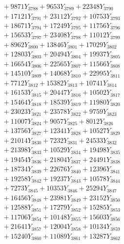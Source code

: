 \documentclass[a4paper,10pt]{article}
\begin{document}
{\begin{align}
&\;  + 9871 Y_{3788} + 9653 Y_{3789} + 22348 Y_{3790} \\[0.3ex]
&\;  + 17121 Y_{3791} + 23112 Y_{3792} + 10753 Y_{3793} \\[0.3ex]
&\;  + 18671 Y_{3794} + 17249 Y_{3795} + 11756 Y_{3796} \\[0.3ex]
&\;  + 15653 Y_{3797} + 23408 Y_{3798} + 11012 Y_{3799} \\[0.3ex]
&\;  + 8962 Y_{3800} + 13846 Y_{3801} + 17029 Y_{3802} \\[0.3ex]
&\;  + 12803 Y_{3803} + 20494 Y_{3804} + 19937 Y_{3805} \\[0.3ex]
&\;  + 16654 Y_{3806} + 22565 Y_{3807} + 11566 Y_{3808} \\[0.5ex]\allowbreak
&\;  + 14510 Y_{3809} + 14068 Y_{3810} + 22995 Y_{3811} \\[0.3ex]
&\;  + 7712 Y_{3812} + 15382 Y_{3813} + 10741 Y_{3814} \\[0.3ex]
&\;  + 16153 Y_{3815} + 20447 Y_{3816} + 10502 Y_{3817} \\[0.3ex]
&\;  + 15464 Y_{3818} + 18539 Y_{3819} + 11980 Y_{3820} \\[0.3ex]
&\;  + 23023 Y_{3821} + 23578 Y_{3822} + 9759 Y_{3823} \\[0.3ex]
&\;  + 11007 Y_{3824} + 9057 Y_{3825} + 8012 Y_{3826} \\[0.3ex]
&\;  + 13756 Y_{3827} + 12341 Y_{3828} + 10527 Y_{3829} \\[0.3ex]
&\;  + 21014 Y_{3830} + 7232 Y_{3831} + 24533 Y_{3832} \\[0.3ex]
&\;  + 21398 Y_{3833} + 10529 Y_{3834} + 19498 Y_{3835} \\[0.3ex]
&\;  + 19454 Y_{3836} + 21804 Y_{3837} + 24491 Y_{3838} \\[0.5ex]\allowbreak
&\;  + 18734 Y_{3839} + 22676 Y_{3840} + 12396 Y_{3841} \\[0.3ex]
&\;  + 19258 Y_{3842} + 19237 Y_{3843} + 10578 Y_{3844} \\[0.3ex]
&\;  + 7273 Y_{3845} + 10353 Y_{3846} + 25294 Y_{3847} \\[0.3ex]
&\;  + 16456 Y_{3848} + 23981 Y_{3849} + 23152 Y_{3850} \\[0.3ex]
&\;  + 12588 Y_{3851} + 17279 Y_{3852} + 15285 Y_{3853} \\[0.3ex]
&\;  + 11706 Y_{3854} + 10148 Y_{3855} + 15603 Y_{3856} \\[0.3ex]
&\;  + 21641 Y_{3857} + 12004 Y_{3858} + 10134 Y_{3859} \\[0.3ex]
&\;  + 15240 Y_{3860} + 11089 Y_{3861} + 13287 Y_{3862} \\[0.3ex]

\end{align}}
\end{document}
